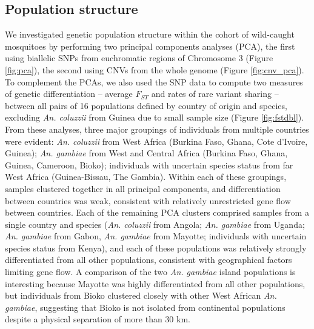 \documentclass[a4paper,11pt,abstracton,hidelinks]{scrartcl}
\begin{document}
\subsection*{Population structure}


%
We investigated genetic population structure within the cohort of wild-caught mosquitoes by performing two principal components analyses (PCA), the first using biallelic SNPs from euchromatic regions of Chromosome 3 (Figure \ref{fig:pca}), the second using CNVs from the whole genome (Figure \ref{fig:cnv_pca}).
%
To complement the PCAs, we also used the SNP data to compute two measures of genetic differentiation -- average $F_{ST}$ and rates of rare variant sharing -- between all pairs of 16 populations defined by country of origin and species, excluding \textit{An. coluzzii} from Guinea due to small sample size (Figure \ref{fig:fstdbl}).
%
From these analyses, three major groupings of individuals from multiple countries were evident: \textit{An. coluzzii} from West Africa (Burkina Faso, Ghana, Cote d'Ivoire, Guinea); \textit{An. gambiae} from West and Central Africa (Burkina Faso, Ghana, Guinea, Cameroon, Bioko); individuals with uncertain species status from far West Africa (Guinea-Bissau, The Gambia). 
%
Within each of these groupings, samples clustered together in all principal components, and differentiation between countries was weak, consistent with relatively unrestricted gene flow between countries.
%
Each of the remaining PCA clusters comprised samples from a single country and species (\textit{An. coluzzii} from Angola; \textit{An. gambiae} from Uganda; \textit{An. gambiae} from Gabon, \textit{An. gambiae} from Mayotte; individuals with uncertain species status from Kenya), and each of these populations was relatively strongly differentiated from all other populations, consistent with geographical factors limiting gene flow.
%
A comparison of the two \textit{An. gambiae} island populations is interesting because Mayotte was highly differentiated from all other populations, but individuals from Bioko clustered closely with other West African \textit{An. gambiae}, suggesting that Bioko is not isolated from continental populations despite a physical separation of more than 30 km.
\end{document}
